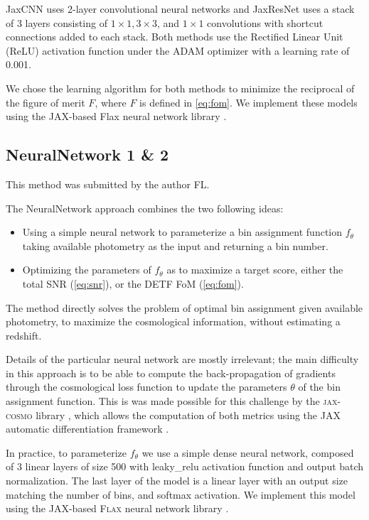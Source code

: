 \documentclass[twocolumn,twocolappendix]{aastex63}
\begin{document}
JaxCNN uses 2-layer convolutional neural networks and JaxResNet uses a stack of
3 layers consisting of $1 \times 1, 3 \times 3$, and $1 \times 1$ convolutions
with shortcut connections added to each stack. Both methods use the Rectified
Linear Unit (ReLU) activation function under the ADAM optimizer \cite{adam} with
a learning rate of 0.001. 
 
We chose the learning algorithm for both methods to minimize the reciprocal of
the figure of merit $F$, where $F$ is defined in \autoref{eq:fom}. We implement
these models using the JAX-based Flax neural network library \cite{jax}. 


\subsection{ {\sc NeuralNetwork 1 \& 2} } \label{sec:nn}
This method was submitted by the author FL.

The {\sc NeuralNetwork} approach combines the two following ideas:
\begin{itemize}
	\item Using a simple neural network to parameterize a bin assignment function $f_\theta$ taking available photometry as the input and returning a bin number. 
	\item Optimizing the parameters of $f_\theta$ as to maximize a target score, either the total SNR (\autoref{eq:snr}), or the DETF FoM (\autoref{eq:fom}).
\end{itemize}
The method directly solves the problem of optimal bin assignment given available photometry, to maximize the cosmological information, without estimating a redshift.


Details of the particular neural network are mostly irrelevant; the main difficulty in this approach is to be able to compute the back-propagation of gradients through the cosmological loss function to update the parameters $\theta$ of the bin assignment function. This is was made possible for this challenge by the \textsc{jax-cosmo} library \citep{jax-cosmo}, which allows the computation of both metrics using the JAX automatic differentiation framework \citep{jax}. 


In practice, to parameterize $f_\theta$ we use a simple dense neural network, composed of 3 linear layers of size 500 with leaky\_relu activation function and output batch normalization. The last layer of the model is a linear layer with an output size matching the number of bins, and softmax activation. We implement this model using the JAX-based \textsc{Flax} neural network library \citep{flax2020github}. 
\end{document}
